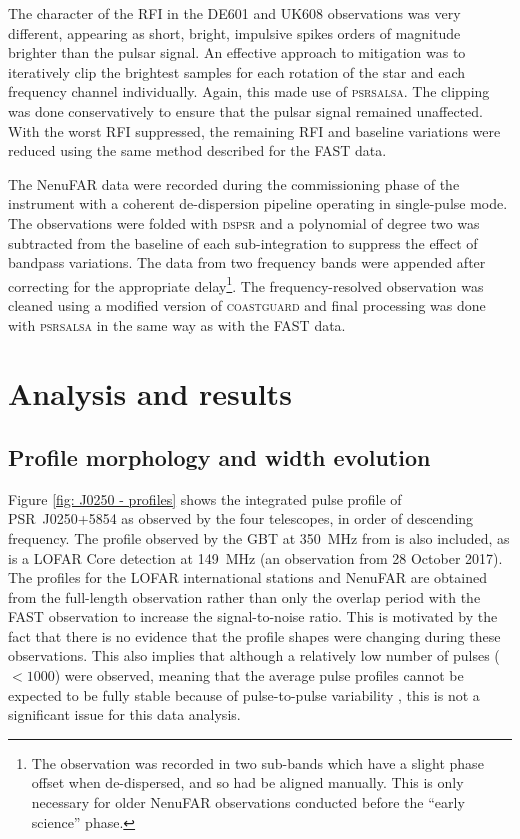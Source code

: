 The character of the RFI in the DE601 and UK608 observations was very different, appearing as short, bright, impulsive spikes orders of magnitude brighter than the pulsar signal. An effective approach to mitigation was to iteratively clip the brightest samples for each rotation of the star and each frequency channel individually. Again, this made use of \textsc{psrsalsa}. The clipping was done conservatively to ensure that the pulsar signal remained unaffected. With the worst RFI suppressed, the remaining RFI and baseline variations were reduced using the same method described for the FAST data.

The NenuFAR data were recorded during the commissioning phase of the instrument with a coherent de-dispersion pipeline \citep[LUPPI;][]{BGT+2020} operating in single-pulse mode. The observations were folded with \textsc{dspsr} and a polynomial of degree two was subtracted from the baseline of each sub-integration to suppress the effect of bandpass variations. The data from two frequency bands were appended after correcting for the appropriate delay\footnote{The observation was recorded in two sub-bands which have a slight phase offset when de-dispersed, and so had be aligned manually. This is only necessary for older NenuFAR observations conducted before the ``early science'' phase.}. The frequency-resolved observation was cleaned using a modified version of \textsc{coastguard} \citep{LKG+2016} and final processing was done with \textsc{psrsalsa} in the same way as with the FAST data.



\section{Analysis and results}
\label{sec: J0250 - analysis}

\subsection{Profile morphology and width evolution}
\label{sec: J0250 - analysis - profile widths}

Figure \ref{fig: J0250 - profiles} shows the integrated pulse profile of PSR~J0250+5854 as observed by the four telescopes, in order of descending frequency. The profile observed by the GBT at 350~MHz from \citet{TBC+2018} is also included, as is a LOFAR Core detection at 149~MHz (an observation from 28 October 2017). The profiles for the LOFAR international stations and NenuFAR are obtained from the full-length observation rather than only the overlap period with the FAST observation to increase the signal-to-noise ratio. This is motivated by the fact that there is no evidence that the profile shapes were changing during these observations. This also implies that although a relatively low number of pulses ($<1000$) were observed, meaning that the average pulse profiles cannot be expected to be fully stable because of pulse-to-pulse variability \citep[e.g.][]{HMTx1975,RRxx1995,LKL+2012}, this is not a significant issue for this data analysis.

